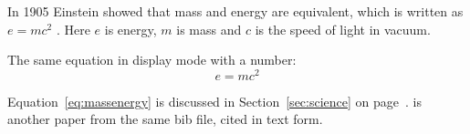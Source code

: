 \documentclass[12pt,a4paper]{article}
\begin{document}
In 1905 Einstein showed that mass and energy are equivalent, which is written
as $e = mc^2$ \citep{einstein1905}. Here $e$ is energy, $m$ is mass and $c$
is the speed of light in vacuum.

The same equation in display mode with a number:
\begin{equation}\label{eq:massenergy}
    e = mc^2
\end{equation}

Equation~\eqref{eq:massenergy} is discussed in Section~\ref{sec:science}
on page~\pageref{sec:science}. \citet{schrodinger1926} is another paper from
the same bib file, cited in text form.



\end{document}

